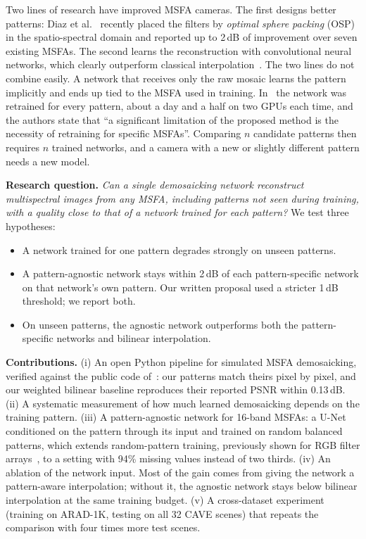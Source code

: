 \documentclass{article}
\begin{document}
Two lines of research have improved MSFA cameras. The first designs better
patterns: Diaz et al.~\cite{diaz2023} recently placed the filters by
\emph{optimal sphere packing} (OSP) in the spatio-spectral domain and reported
up to 2\,dB of improvement over seven existing MSFAs. The second learns the
reconstruction with convolutional neural networks, which clearly outperform
classical interpolation~\cite{feng2021,diaz2023}. The two lines do not
combine easily. A network that receives only the raw mosaic learns the
pattern implicitly and ends up tied to the MSFA used in training.
In~\cite{diaz2023} the network was retrained for every pattern, about a day
and a half on two GPUs each time, and the authors state that ``a significant
limitation of the proposed method is the necessity of retraining for
specific MSFAs''. Comparing $n$ candidate patterns then requires $n$ trained
networks, and a camera with a new or slightly different pattern needs a new
model.

\textbf{Research question.} \emph{Can a single demosaicking network
reconstruct multispectral images from any MSFA, including patterns not seen
during training, with a quality close to that of a network trained for each
pattern?} We test three hypotheses:
\begin{itemize}
  \item[\textbf{H1}] A network trained for one pattern degrades strongly on
        unseen patterns.
  \item[\textbf{H2}] A pattern-agnostic network stays within 2\,dB of each
        pattern-specific network on that network's own pattern. Our written
        proposal used a stricter 1\,dB threshold; we report both.
  \item[\textbf{H3}] On unseen patterns, the agnostic network outperforms
        both the pattern-specific networks and bilinear interpolation.
\end{itemize}

\textbf{Contributions.} (i) An open Python pipeline for simulated MSFA
demosaicking, verified against the public code of~\cite{diaz2023}: our
patterns match theirs pixel by pixel, and our weighted bilinear baseline
reproduces their reported PSNR within 0.13\,dB. (ii) A systematic
measurement of how much learned demosaicking depends on the training
pattern. (iii) A pattern-agnostic network for 16-band MSFAs: a U-Net
conditioned on the pattern through its input and trained on random balanced
patterns, which extends random-pattern training, previously shown for RGB
filter arrays~\cite{bourrier2022}, to a setting with 94\% missing values
instead of two thirds. (iv) An ablation of the network input. Most of the
gain comes from giving the network a pattern-aware interpolation; without
it, the agnostic network stays below bilinear interpolation at the same
training budget. (v) A cross-dataset experiment (training on ARAD-1K,
testing on all 32 CAVE scenes) that repeats the comparison with four times
more test scenes.
\end{document}
